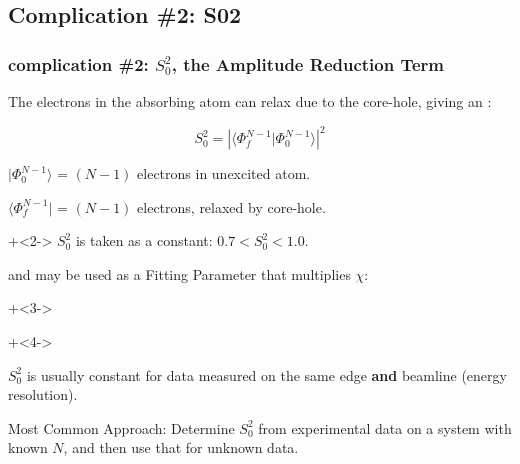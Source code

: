 \subsection{{\feff} Complication \#2: S02}
\begin{frame} \frametitle{{\feff} complication \#2: $S_0^2$, the  Amplitude Reduction Term}

  \vmm
    \begin{cenpage}{110mm}

  The {} electrons in the absorbing atom can relax due to
  the core-hole, giving an {}:

   \vmm
   \[
   S_0^2 =  {  |{\langle \Phi^{N-1}_f |\Phi^{N-1}_0 \rangle}|^2}
   \]

    \vspace{1mm}

    ${| \Phi^{N-1}_0 \rangle }$ = $(N-1)$ electrons in unexcited atom.

    ${\langle \Phi^{N-1}_f|}$   = $(N-1)$ electrons, relaxed by core-hole.

    \vmm

    \onslide+<2->
    ${S_0^2}$ is taken as a constant: \hspace{3mm}  $ 0.7 < S_0^2 < 1.0 $.

    and may be used as a Fitting Parameter that multiplies {$\chi$}:

    \vmm \vmm
    \onslide+<3->
    \begin{center}
      {}
    \end{center}

    \onslide+<4->

    \begin{postitbox}{68mm}
      $S_0^2$ is usually constant for  data measured on
      the same edge {\bf{and}} beamline (energy resolution).
    \end{postitbox}

    Most Common Approach: Determine $S_0^2$ from experimental data on a
    system with known $N$, and then use that for unknown data. 

    \vmm

    \end{cenpage}

\end{frame}

